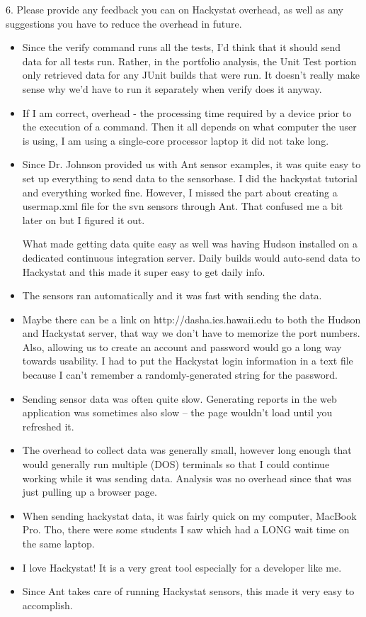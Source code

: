 \documentclass[11pt]{article}
\begin{document}
6. Please provide any feedback you can on Hackystat overhead, 
as well as any suggestions you have to reduce the overhead 
in future. 
\begin{itemize}
\item Since the verify command runs all the tests, I'd think that it should send data for all tests run.  Rather, in the portfolio analysis, the Unit Test portion only retrieved data for any JUnit builds that were run.  It doesn't really make sense why we'd have to run it separately when verify does it anyway.
\item If I am correct, overhead - the processing time required by a device prior to the execution of a command.  Then it all depends on what computer the user is using,  I am using a single-core processor laptop it did not take long.
\item Since Dr. Johnson provided us with Ant sensor examples, it was quite easy to set up everything to send data to the sensorbase. I did the hackystat tutorial and everything worked fine. However, I missed the part about creating a usermap.xml file for the svn sensors through Ant. That confused me a bit later on but I figured it out.

What made getting data quite easy as well was having Hudson installed on a dedicated continuous integration server. Daily builds would auto-send data to Hackystat and this made it super easy to get daily info.
\item The sensors ran automatically and it was fast with sending the data.
\item Maybe there can be a link on http://dasha.ics.hawaii.edu to both the Hudson and Hackystat server, that way we don't have to memorize the port numbers. Also, allowing us to create an account and password would go a long way towards usability. I had to put the Hackystat login information in a text file because I can't remember a randomly-generated string for the password.
\item Sending sensor data was often quite slow.  Generating reports in the web application was sometimes also slow -- the page wouldn't load until you refreshed it.
\item The overhead to collect data was generally small, however long enough that would generally run multiple (DOS) terminals so that I could continue working while it was sending data.  Analysis was no overhead since that was just pulling up a browser page.
\item When sending hackystat data, it was fairly quick on my computer, MacBook Pro. Tho, there were some students I saw which had a LONG wait time on the same laptop.
\item I love Hackystat! It is a very great tool especially for a developer like me.
\item Since Ant takes care of running Hackystat sensors, this made it very easy to accomplish. 
\end{itemize}
\end{document}
